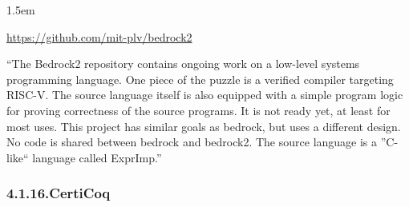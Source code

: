 \documentclass[12pt,twoside]{article}
\begin{document}
\begin{mddefinitions}%


\begin{mdbmarginx}{}{}{}{1.5em}%
\begin{mddefdata}%
\href{https://github.com/mit-plv/bedrock2}{{\ttfamily https://\hspace{0pt}github.\hspace{0pt}com/\hspace{0pt}mit-\hspace{0pt}plv/\hspace{0pt}bedrock2}}%
\end{mddefdata}%
\end{mdbmarginx}%
\end{mddefinitions}%

\noindent{}\textquotedblleft{}The Bedrock2 repository contains ongoing work on a low-level systems
programming language. One piece of the puzzle is a verified compiler
targeting RISC-V. The source language itself is also equipped with a
simple program logic for proving correctness of the source
programs. It is not ready yet, at least for most uses.  This project
has similar goals as bedrock, but uses a different design. No code is
shared between bedrock and bedrock2.
The source language is a \textquotedblright{}C-like\textquotedblleft{} language called ExprImp.\textquotedblright{}%

\subsubsection{4.1.16.\hspace*{0.5em}CertiCoq}\label{sec-certicoq}%
\end{document}
